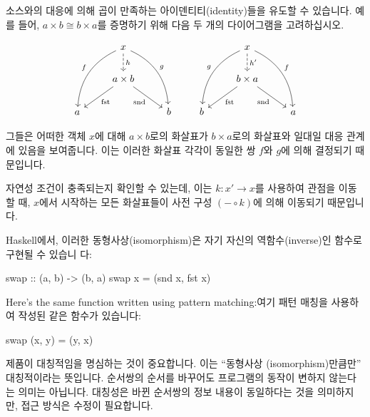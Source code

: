 \documentclass[DaoFP]{subfiles}
\begin{document}
소스와의 대응에 의해 곱이 만족하는 아이덴티티(identity)들을 유도할 수 있습니다. 예를 들어, $a \times b \cong b \times a$를 증명하기 위해 다음 두 개의 다이어그램을 고려하십시오.

\[
 \begin{tikzcd}
 &x
 \arrow[d, dashed, "h"]
 \arrow[ddl, bend right, "f"']
 \arrow[ddr, bend left, "g"]
 \\
 & a \times b
  \arrow[dl,  "\text{fst}"]
 \arrow[dr,   "\text{snd}"']
 \\
a && b
 \end{tikzcd}
 \qquad
 \begin{tikzcd}
 &x
 \arrow[d, dashed, "h'"]
 \arrow[ddl, bend right, "g"']
 \arrow[ddr, bend left, "f"]
 \\
 & b \times a
  \arrow[dl,  "\text{fst}"]
 \arrow[dr,   "\text{snd}"']
\\
b && a
  \end{tikzcd}
\]

그들은 어떠한 객체 $x$에 대해 $a \times b$로의 화살표가 $b \times a$로의 화살표와 일대일 대응 관계에 있음을 보여줍니다. 이는 이러한 화살표 각각이 동일한 쌍 $f$와 $g$에 의해 결정되기 때문입니다.

자연성 조건이 충족되는지 확인할 수 있는데, 이는 $k \colon x' \to x$를 사용하여 관점을 이동할 때, $x$에서 시작하는 모든 화살표들이 사전 구성 $(- \circ k)$에 의해 이동되기 때문입니다.

Haskell에서, 이러한 동형사상(isomorphism)은 자기 자신의 역함수(inverse)인 함수로 구현될 수 있습니  다:
\begin{haskell}
swap :: (a, b) -> (b, a)
swap x = (snd x, fst x)
\end{haskell}
Here's the same function written using pattern matching:여기 패턴 매칭을 사용하여 작성된 같은 함수가 있습니다:
\begin{haskell}
swap (x, y) = (y, x)
\end{haskell}

제품이 대칭적임을 명심하는 것이 중요합니다. 이는 ``동형사상 (isomorphism)만큼만'' 대칭적이라는 뜻입니다. 순서쌍의 순서를 바꾸어도 프로그램의 동작이 변하지 않는다는 의미는 아닙니다. 대칭성은 바뀐 순서쌍의 정보 내용이 동일하다는 것을 의미하지만, 접근 방식은 수정이 필요합니다.
\end{document}
